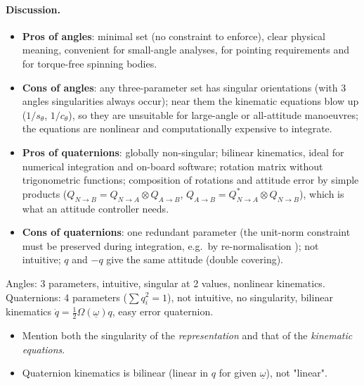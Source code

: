 \paragraph{Discussion.}
\begin{itemize}
\item \textbf{Pros of angles}: minimal set (no constraint to enforce), clear physical meaning, convenient for small-angle analyses, for
pointing requirements and for torque-free spinning bodies.
\item \textbf{Cons of angles}: any three-parameter set has singular orientations (with 3 angles singularities always occur); near them the
kinematic equations blow up ($1/s_\theta$, $1/c_\theta$), so they are unsuitable for large-angle or all-attitude manoeuvres; the
equations are nonlinear and computationally expensive to integrate.
\item \textbf{Pros of quaternions}: globally non-singular; bilinear kinematics, ideal for numerical integration and on-board
software; rotation matrix without trigonometric functions; composition of rotations and attitude error by simple products
($Q_{N\to B}=Q_{N\to A}\otimes Q_{A\to B}$, $Q_{A\to B}=Q^*_{N\to A}\otimes Q_{N\to B}$), which is what an attitude controller needs.
\item \textbf{Cons of quaternions}: one redundant parameter (the unit-norm constraint must be preserved during integration, e.g.\ by
re-normalisation \notinnotes); not intuitive; $q$ and $-q$ give the same attitude (double covering).
\end{itemize}

\begin{keyf}
Angles: 3 parameters, intuitive, singular at 2 values, nonlinear kinematics. Quaternions: 4 parameters ($\sum q_i^2=1$), not intuitive,
no singularity, bilinear kinematics $\dot q=\frac12\Omega(\underline\omega)q$, easy error quaternion.
\end{keyf}

\pitfalls
\begin{itemize}
\item Mention both the singularity of the \emph{representation} and that of the \emph{kinematic equations}.
\item Quaternion kinematics is bilinear (linear in $q$ for given $\underline\omega$), not "linear".
\end{itemize}


